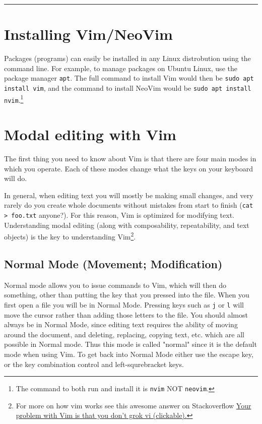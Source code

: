 \documentclass[11pt]{article}
\begin{document}
\noindent\rule{\textwidth}{0.5pt}

\newpage

\section{Installing Vim/NeoVim}
\label{sec:org52a5025}
Packages (programs) can easily be installed in any Linux distrobution using the command line.
For example, to manage packages on Ubuntu Linux, use the package manager \texttt{apt}. The full
command to install Vim would then be \texttt{sudo apt install vim}, and the command to install
NeoVim would be \texttt{sudo apt install nvim}.\footnote{The command to both run and install it is \texttt{nvim} NOT \texttt{neovim}.} 
\section{Modal editing with Vim}
\label{sec:orgbe95364}
The first thing you need to know about Vim is that there are four main modes in
which you operate. Each of these modes change what the keys on your keyboard
will do.

In general, when editing text you will mostly be making small changes, and very
rarely do you create whole documents without mistakes from start to finish (\texttt{cat
> foo.txt} anyone?). For this reason, Vim is optimized for modifying text.
Understanding modal editing (along with composability, repeatability, and text
objects) is the key to understanding Vim\footnote{For more on how vim works see this awesome answer on Stackoverflow
\href{https://stackoverflow.com/questions/1218390/what-is-your-most-productive-shortcut-with-vim}{Your problem with Vim is that you don't grok vi (clickable).}}.
\subsection{Normal Mode (Movement; Modification)}
\label{sec:orgcdc7693}
Normal mode allows you to issue commands to Vim, which will then do something,
other than putting the key that you pressed into the file. When you first open a
file you will be in Normal Mode. Pressing keys such as \texttt{j} or \texttt{l} will move the
cursor rather than adding those letters to the file. You should almost always be
in Normal Mode, since editing text requires the ability of moving around the
document, and deleting, replacing, copying text, etc. which are all possible in
Normal mode. Thus this mode is called "normal" since it is the default mode when
using Vim. To get back into Normal Mode either use the escape key, or the key 
combination control and left-squrebracket keys.
\end{document}
